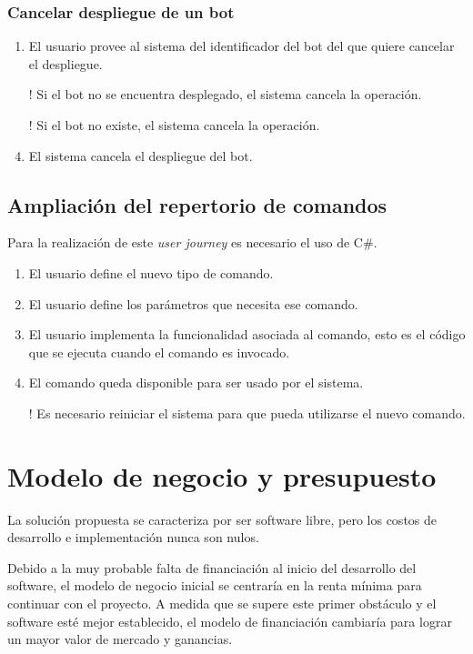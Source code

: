 \subsubsection{Cancelar despliegue de un bot}

\begin{enumerate}
	\item El usuario provee al sistema del identificador del bot del que quiere cancelar el despliegue.
	\item[!] Si el bot no se encuentra desplegado, el sistema cancela la operación.
	\item[!] Si el bot no existe, el sistema cancela la operación.
	\item El sistema cancela el despliegue del bot.
\end{enumerate}


\subsection{Ampliación del repertorio de comandos}

Para la realización de este \textit{user journey} es necesario el uso de C\#.

\begin{enumerate}
	\item El usuario define el nuevo tipo de comando.
	\item El usuario define los parámetros que necesita ese comando.
	\item El usuario implementa la funcionalidad asociada al comando, esto es el código que se ejecuta cuando el comando es invocado.
	\item El comando queda disponible para ser usado por el sistema.
	\item[!] Es necesario reiniciar el sistema para que pueda utilizarse el nuevo comando.
\end{enumerate}

\section{Modelo de negocio y presupuesto}

La solución propuesta se caracteriza por ser software libre, pero los costos de desarrollo e implementación nunca son nulos.

Debido a la muy probable falta de financiación al inicio del desarrollo del software, el modelo de negocio inicial se centraría en la renta mínima para continuar con el proyecto. A medida que se supere este primer obstáculo y el software esté mejor establecido, el modelo de financiación cambiaría para lograr un mayor valor de mercado y ganancias.

